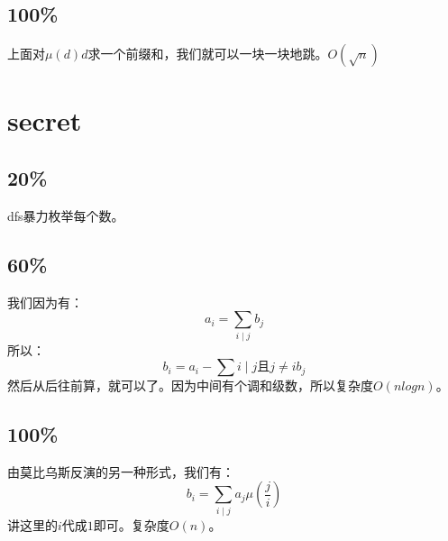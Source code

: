 \documentclass[10pt,a4paper,twoside]{article}
\begin{document}
		\subsection{100\%}
			上面对$\mu(d)d$求一个前缀和，我们就可以一块一块地跳。$O(\sqrt{n})$
		
	\newpage
	\section{secret}
		\subsection{20\%}
			dfs暴力枚举每个数。
		\subsection{60\%}
			我们因为有：
			  $$
				   a_i = \sum_{i \mid j} b_j
			  $$
			所以：
			$$
				b_i = a_i - \sum{i \mid j \text{且} j \neq i} b_j
			$$
			然后从后往前算，就可以了。因为中间有个调和级数，所以复杂度$O(nlogn)$。
		\subsection{100\%}
			由莫比乌斯反演的另一种形式，我们有：
			$$
				b_i = \sum_{i \mid j}a_j\mu(\frac{j}{i})
			$$	
			讲这里的$i$代成$1$即可。复杂度$O(n)$。
\end{document}
